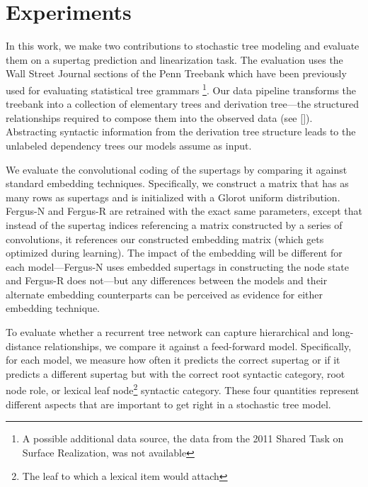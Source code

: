 \documentclass[11pt]{article}
\begin{document}
\section{Experiments}
\label{sec:expt}

In this work, we make two contributions to stochastic tree modeling and evaluate them on a supertag prediction and linearization task. 
%
The evaluation uses the Wall Street Journal sections of the Penn Treebank which have been previously used for evaluating statistical tree grammars \cite{chiang2000statistical}\footnote{A possible additional data source, the data from the 2011 Shared Task on Surface Realization, was not available}.
%
Our data pipeline transforms the treebank into a collection of elementary trees and derivation tree---the structured relationships required to compose them into the observed data (see \ref{}).
%
Abstracting syntactic information from the derivation tree structure leads to the unlabeled dependency trees our models assume as input. 

We evaluate the convolutional coding of the supertags by comparing it against standard embedding techniques.
%
Specifically, we construct a matrix that has as many rows as supertags and is initialized with a Glorot uniform distribution.
%
Fergus-N and Fergus-R are retrained with the exact same parameters, except that instead of the supertag indices referencing a matrix constructed by a series of convolutions, it references our constructed embedding matrix (which gets optimized during learning). 
%
The impact of the embedding will be different for each model---Fergus-N uses embedded supertags in constructing the node state and Fergus-R does not---but any differences between the models and their alternate embedding counterparts can be perceived as evidence for either embedding technique.  


To evaluate whether a recurrent tree network can capture hierarchical and long-distance relationships, we compare it against a feed-forward model. 
%
Specifically, for each model, we measure how often it predicts the correct supertag or if it predicts a different supertag but with the correct root syntactic category, root node role, or lexical leaf node\footnote{The leaf to which a lexical item would attach} syntactic category.
%
These four quantities represent different aspects that are important to get right in a stochastic tree model.


\end{document}
